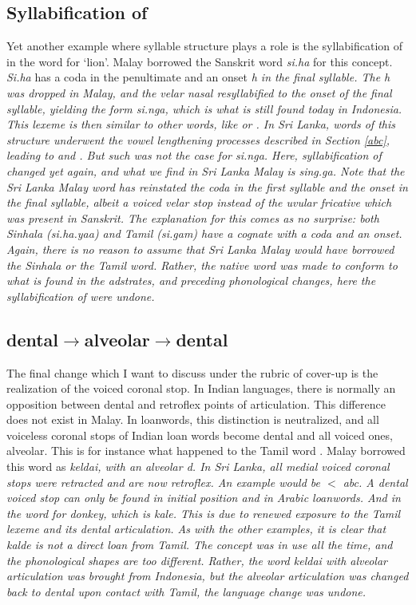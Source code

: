 \documentclass[a4paper,10pt]{article}
\begin{document}
\subsection{Syllabification of {\ng}} 
Yet another example where syllable structure plays a role is the syllabification of {\ng} in the word for `lion'. Malay borrowed the Sanskrit word {\em si{\ng}.ha} for this concept. {\em Si{\ng}.ha} has a coda {\ng} in the penultimate and an onset \em h \em in the final syllable. The h was dropped in Malay, and the velar nasal resyllabified to the onset of the final syllable, yielding the form \em si.nga\em, which is what is still found today in Indonesia. This lexeme is then similar to other words, like  or . In Sri Lanka, words of this structure underwent the vowel lengthening processes described in Section \ref{abc}, leading to  and . But such was not the case for \em si.nga\em. Here, syllabification of {\ng} changed yet again, and what we find in Sri Lanka Malay is \em sing.ga\em. Note that the Sri Lanka Malay word has reinstated the coda in the first syllable and the onset in the final syllable, albeit a voiced velar stop instead of the uvular fricative which was present in Sanskrit. The explanation for this comes as no surprise: both Sinhala ({\em si{\ng}.ha.yaa}) and Tamil ({\em si{\ng}.gam}) have a cognate with a coda and an onset. Again, there is no reason to assume that Sri Lanka Malay would have borrowed the Sinhala or the Tamil word. Rather, the native word was made to conform to what is found in the adstrates, and preceding phonological changes, here the syllabification of {\ng} were undone.

\subsection{dental$\to$alveolar$\to$dental} 
The final change which I want to discuss under the rubric of cover-up is the realization of the voiced coronal stop. In Indian languages, there is normally an opposition between dental and retroflex points of articulation. This difference does not exist in Malay. In loanwords, this distinction is neutralized, and all voiceless coronal stops of Indian loan words become dental and all voiced ones, alveolar. This is for instance what happened to the Tamil word . Malay borrowed this word as \em keldai\em, with an alveolar d. In Sri Lanka, all medial voiced coronal stops were retracted and are now retroflex. An example would be  $<$ \em abc\em. A dental voiced stop can only be found in initial position and in Arabic loanwords. And in the word for donkey, which is \em kal{\dentd}e\em. This is due to renewed exposure to the Tamil lexeme and its dental articulation. As with the other examples, it is clear that \em kalde \em is not a direct loan from Tamil. The concept was in use all the time, and the phonological shapes are too different. Rather, the word \em keldai \em with alveolar articulation was brought from Indonesia, but the alveolar articulation was changed back to dental upon contact with Tamil, the language change was undone. 
\end{document}
